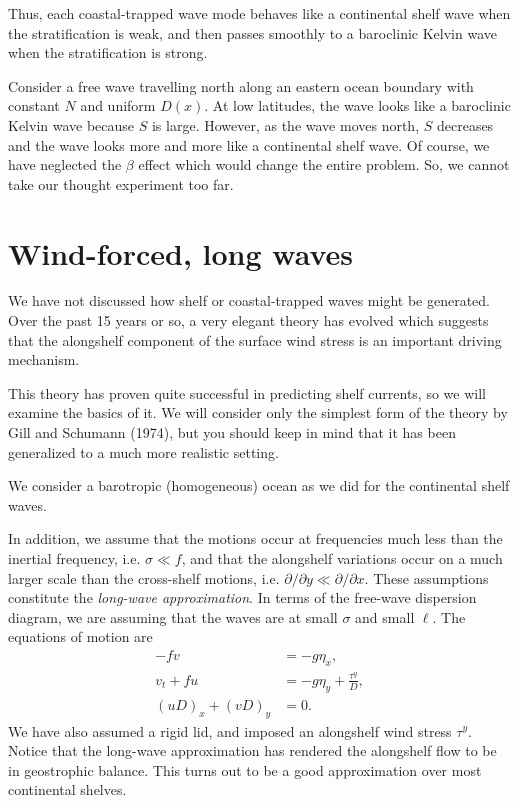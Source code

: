 Thus, each coastal-trapped wave mode behaves like a continental shelf wave when the
stratification is weak, and then passes smoothly to a baroclinic Kelvin wave when the
stratification is strong.


Consider a free wave travelling north along an eastern ocean boundary with constant
$N$ and uniform $D(x)$. At low latitudes, the wave looks like a baroclinic Kelvin wave
because $S$ is large. However, as the wave moves north, $S$ decreases and the wave
looks more and more like a continental shelf wave. Of course, we have neglected the
$\beta$ effect which would change the entire problem. So, we cannot take our thought
experiment too far.

\section{Wind-forced, long waves}

We have not discussed how shelf or coastal-trapped waves might be generated. Over the
past 15 years or so, a very elegant theory has evolved which suggests that the
alongshelf component of the surface wind stress is an important driving mechanism.

\sourcepagebreak

This theory has proven quite successful in predicting shelf currents, so we will examine
the basics of it. We will consider only the simplest form of the theory by Gill and
Schumann (1974), but you should keep in mind that it has been generalized to a much
more realistic setting.

We consider a barotropic (homogeneous) ocean as we did for the continental shelf waves.


In addition, we assume that the motions occur at frequencies much less than the inertial
frequency, i.e. $\sigma\ll f$, and that the alongshelf variations occur on a much larger
scale than the cross-shelf motions, i.e.
$\partial/\partial y\ll\partial/\partial x$. These assumptions constitute the
\emph{long-wave approximation}. In terms of the free-wave dispersion diagram, we are
assuming that the waves are at small $\sigma$ and small $\ell$. The equations of motion
are
\begin{align*}
	-fv           & =-g\eta_x,                  \\
	v_t+fu        & =-g\eta_y+\frac{\tau^y}{D}, \\
	(uD)_x+(vD)_y & =0.
\end{align*}
We have also assumed a rigid lid, and imposed an alongshelf wind stress $\tau^y$.
Notice that the long-wave approximation has rendered the alongshelf flow to be in
geostrophic balance. This turns out to be a good approximation over most continental
shelves.

